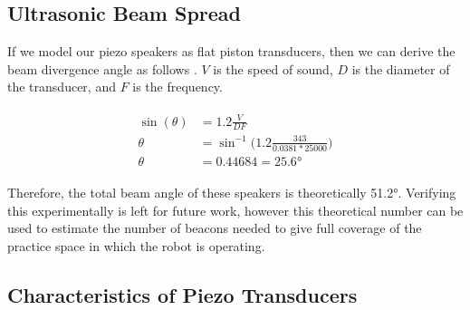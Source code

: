 \documentclass{article}
\begin{document}

  \subsection{Ultrasonic Beam Spread}

    If we model our piezo speakers as flat piston transducers, then we can derive the beam divergence angle as follows \cite{bond_beam_2001}. $V$ is the speed of sound, $D$ is the diameter of the transducer, and $F$ is the frequency.

    \begin{align} \label{eq:beam_divergence}
      \begin{split}
        \sin(\theta) &= 1.2\frac{V}{DF} \\
        \theta &= \sin^{-1}\bigg(1.2\frac{343}{0.0381*25000}\bigg) \\
        \theta &= 0.44684 = \ang{25.6}
      \end{split}
    \end{align}

    Therefore, the total beam angle of these speakers is theoretically \ang{51.2}. Verifying this experimentally is left for future work, however this theoretical number can be used to estimate the number of beacons needed to give full coverage of the practice space in which the robot is operating.

  \subsection{Characteristics of Piezo Transducers}
\end{document}
